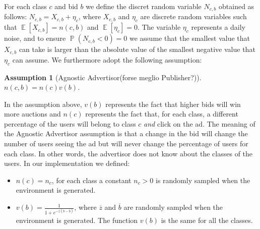 \documentclass[11pt]{article} %
\DeclareMathOperator{\EX}{\mathbb{E}}
\DeclareMathOperator{\Prob}{\mathbb{P}}
\newtheorem*{assumption}{Assumption}
\begin{document}
For each class $c$ and bid $b$ we define the discret random variable $N_{c,b}$ obtained as follows: $N_{c,b} = X_{c,b} + \eta_c$, where $X_{c,b}$ and $\eta_c$ are discrete random variables such that $\EX[X_{c,b}]=n(c,b)$ and $\EX[\eta_c]=0$. The variable $\eta_c$ represents a daily noise, and to ensure $\Prob(N_{c,b} < 0) = 0$ we assume that the smallest value that $X_{c,b}$ can take is larger than the absolute value of the smallest negative value that $\eta_c$ can assume.
\newline
\newline
We furthermore adopt the following assumption: 
\begin{assumption}[Agnostic Advertisor(forse meglio Publisher?)]
$n(c,b)=n(c)v(b)$.
\end{assumption}
In the assumption above, $v(b)$ represents the fact that higher bids will win more auctions and $n(c)$ represents the fact that, for each class, a different percentage of the users will belong to class $c$ \textit{and} click on the ad. The meaning of the Agnostic Advertisor assumption is that a change in the bid will change the number of users seeing the ad but will never change the percentage of users for each class. In other words, the advertisor does not know about the classes of the users.
\newline
\newline
In our implementation we defined:
\begin{itemize}
\item $n(c)=n_c$, for each class a constant $n_c > 0$ is randomly sampled when the environment is generated.
\item $v(b)=\frac{1}{1+e^{-\overline z(b-\overline b)}}$, where $\overline z$ and $\overline b$ are randomly sampled when the environment is generated. The function $v(b)$ is the same for all the classes.
\end{itemize}
\end{document}
